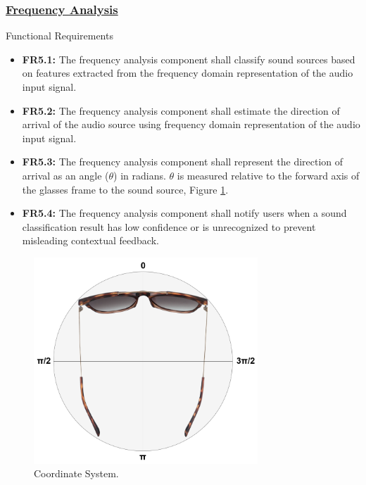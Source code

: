\documentclass[12pt]{article}
\theoremstyle{definition}
\begin{document}
\subsubsection{\hyperref[comp:frequency_analysis]{Frequency Analysis}} 
Functional Requirements
\begin{itemize}
  \item \label{FR5_1}\textbf{FR5.1:} The frequency analysis component shall
  classify sound sources based on features extracted from the frequency domain
  representation of the audio input signal.

   \item \label{FR5_2}\textbf{FR5.2:} The frequency analysis component shall
   estimate the direction of arrival of the audio source using frequency domain
   representation of the audio input signal. 
   
   \item \label{FR5_3}\textbf{FR5.3:} The frequency analysis component shall 
   represent the direction of arrival as an angle ($\theta$) in radians.
   $\theta$ is measured relative to the forward axis of the glasses frame
   to the sound source, Figure \ref{fig:coordinate_system}.

   \item \label{FR5_4}\textbf{FR5.4:} The frequency analysis component shall
   notify users when a sound classification result has low confidence or is
   unrecognized to prevent misleading contextual feedback.
\end{itemize}

\begin{figure}[H]     
    \centering 
    \includegraphics[width=0.75\textwidth]{diagrams/glasses_coordinate.png}
    \caption{Coordinate System.}
    \label{fig:coordinate_system}
\end{figure}
\end{document}
